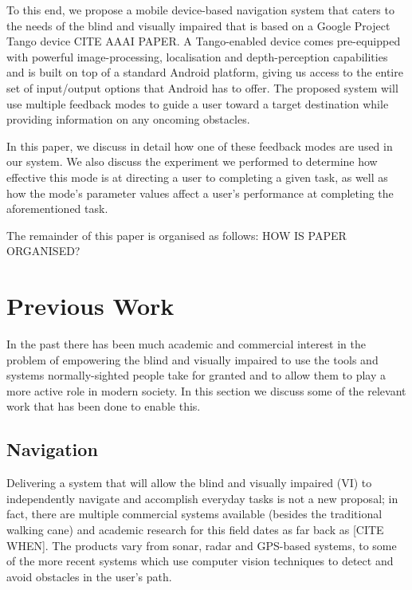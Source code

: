 \documentclass[format=sigconf, review=true, screen=true, anonymous=true]{acmart}
\begin{document}
To this end, we propose a mobile device-based navigation system that caters to the needs of the blind and visually impaired that is based on a Google Project Tango device {CITE AAAI PAPER}. A Tango-enabled device comes pre-equipped with powerful image-processing, localisation and depth-perception capabilities and is built on top of a standard Android platform, giving us access to the entire set of input/output options that Android has to offer. The proposed system will use multiple feedback modes to guide a user toward a target destination while providing information on any oncoming obstacles.

In this paper, we discuss in detail how one of these feedback modes are used in our system. We also discuss the experiment we performed to determine how effective this mode is at directing a user to completing a given task, as well as how the mode's parameter values affect a user's performance at completing the aforementioned task. 

The remainder of this paper is organised as follows: HOW IS PAPER ORGANISED?

\section{Previous Work}

In the past there has been much academic and commercial interest in the problem of empowering the blind and visually impaired to use the tools and systems normally-sighted people take for granted and to allow them to play a more active role in modern society. In this section we discuss some of the relevant work that has been done to enable this. 

\subsection{Navigation}

Delivering a system that will allow the blind and visually impaired (VI) to independently navigate and accomplish everyday tasks is not a new proposal; in fact, there are multiple commercial systems available (besides the traditional walking cane) and academic research for this field dates as far back as [CITE WHEN]. The products vary from sonar, radar and GPS-based systems, to some of the more recent systems which use computer vision techniques to detect and avoid obstacles in the user's path. 
\end{document}
